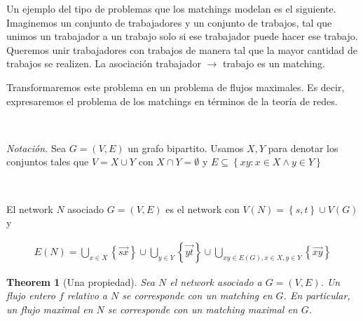 \documentclass[a4paper]{article}
\newtheorem{theorem}{Theorem}
\newtheorem{theorem}{Theorem}
\begin{document}
Un ejemplo del tipo de problemas que los matchings modelan es el siguiente.
Imaginemos un conjunto de trabajadores y un conjunto de trabajos, tal que 
unimos un trabajador a un trabajo solo si ese trabajador puede hacer ese 
trabajo. Queremos unir trabajadores con trabajos de manera tal que la 
mayor cantidad de trabajos se realizen. La asociación trabajador $\to $ trabajo
es un matching.

Transformaremos este problema en un problema de flujos maximales. Es decir,
expresaremos el problema de los matchings en términos de la teoría de redes.

~ 

\textit{Notación.} Sea $G = (V, E) $ un grafo bipartito. Usamos $X, Y$ para
denotar los conjuntos tales que $V = X \cup Y$ con $X \cap Y = \emptyset$ y $E
\subseteq \left\{ xy :  x \in X \land y \in Y \right\} $


~

\begin{definition}
    
    El network $N$ asociado $G = (V, E) $ es el network con $V(N) = \left\{ s, t \right\} \cup V(G)$ y

    \begin{align*}
        E(N) = \bigcup_{x \in X} \left\{ \overrightarrow{sx} \right\} \cup \bigcup_{y \in Y}\left\{ \overrightarrow{yt} \right\} \cup \bigcup_{xy \in E(G), x \in X, y \in Y} \left\{ \overrightarrow{xy} \right\} 
    \end{align*}
\end{definition}

\begin{theorem}[Una propiedad]
    Sea $N$ el network asociado a $G = (V, E) $. Un flujo entero $f$ relativo a
    $N$ se corresponde con un matching en $G$. En particular, un flujo maximal
    en $N$ se corresponde con un matching maximal en $G$.
\end{theorem}
\end{document}
